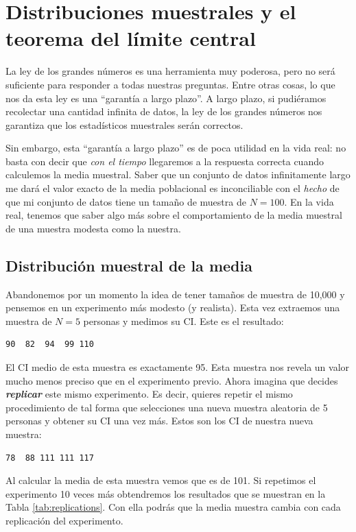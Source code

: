 \documentclass[spanish,]{book}
\begin{document}
\section{Distribuciones muestrales y el teorema del límite
central}\label{samplesandclt}

La ley de los grandes números es una herramienta muy poderosa, pero no
será suficiente para responder a todas nuestras preguntas. Entre otras
cosas, lo que nos da esta ley es una ``garantía a largo plazo''. A largo
plazo, si pudiéramos recolectar una cantidad infinita de datos, la ley
de los grandes números nos garantiza que los estadísticos muestrales
serán correctos.

Sin embargo, esta ``garantía a largo plazo'' es de poca utilidad en la
vida real: no basta con decir que \emph{con el tiempo} llegaremos a la
respuesta correcta cuando calculemos la media muestral. Saber que un
conjunto de datos infinitamente largo me dará el valor exacto de la
media poblacional es inconciliable con el \emph{hecho} de que mi
conjunto de datos tiene un tamaño de muestra de \(N=100\). En la vida
real, tenemos que saber algo más sobre el comportamiento de la media
muestral de una muestra modesta como la nuestra.

\subsection{Distribución muestral de la media}\label{samplingdists}

Abandonemos por un momento la idea de tener tamaños de muestra de 10,000
y pensemos en un experimento más modesto (y realista). Esta vez
extraemos una muestra de \(N=5\) personas y medimos su CI. Este es el
resultado:

\begin{verbatim}
90  82  94  99 110
\end{verbatim}

El CI medio de esta muestra es exactamente 95. Esta muestra nos revela
un valor mucho menos preciso que en el experimento previo. Ahora imagina
que decides \textbf{\emph{replicar}} este mismo experimento. Es decir,
quieres repetir el mismo procedimiento de tal forma que selecciones una
nueva muestra aleatoria de 5 personas y obtener su CI una vez más. Estos
son los CI de nuestra nueva muestra:

\begin{verbatim}
78  88 111 111 117
\end{verbatim}

Al calcular la media de esta muestra vemos que es de 101. Si repetimos
el experimento 10 veces más obtendremos los resultados que se muestran
en la Tabla \ref{tab:replications}. Con ella podrás que la media muestra
cambia con cada replicación del experimento.
\end{document}
